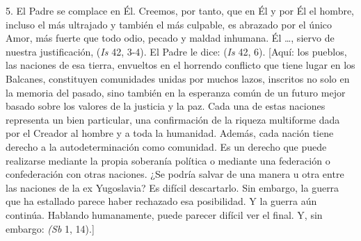 \begin{body}
					5. El Padre se complace en Él. Creemos, por tanto, que en Él y por Él el hombre, incluso el más ultrajado y también el más culpable, es abrazado por el único Amor, más fuerte que todo odio, pecado y maldad inhumana. Él \ldots{}, siervo de nuestra justificación,  (\emph{Is} 42, 3-4). El Padre le dice:  (\emph{Is} 42, 6). {[}Aquí: los pueblos, las naciones de esa tierra, envueltos en el horrendo conflicto que tiene lugar en los Balcanes, constituyen comunidades unidas por muchos lazos, inscritos no solo en la memoria del pasado, sino también en la esperanza común de un futuro mejor basado sobre los valores de la justicia y la paz. Cada una de estas naciones representa un bien particular, una confirmación de la riqueza multiforme dada por el Creador al hombre y a toda la humanidad. Además, cada nación tiene derecho a la autodeterminación como comunidad. Es un derecho que puede realizarse mediante la propia soberanía política o mediante una federación o confederación con otras naciones. ¿Se podría salvar de una manera u otra entre las naciones de la ex Yugoslavia? Es difícil descartarlo. Sin embargo, la guerra que ha estallado parece haber rechazado esa posibilidad. Y la guerra aún continúa. Hablando humanamente, puede parecer difícil ver el final. Y, sin embargo:  \emph{(Sb} 1, 14).{]}
					

\end{body}
